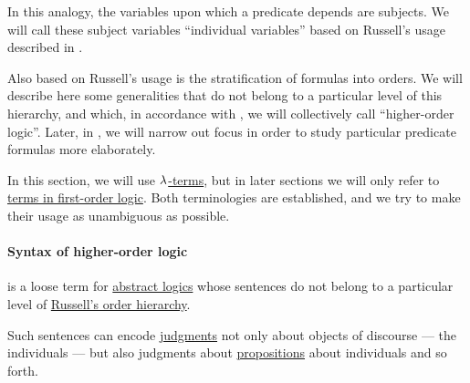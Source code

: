 \begin{remark}
  In this analogy, the variables upon which a predicate depends are subjects. We will call these subject variables \enquote{individual variables} based on Russell's usage described in .

  Also based on Russell's usage is the stratification of formulas into orders. We will describe here some generalities that do not belong to a particular level of this hierarchy, and which, in accordance with , we will collectively call \enquote{higher-order logic}. Later, in , we will narrow out focus in order to study particular predicate formulas more elaborately.
\end{remark}

\begin{remark}\label{rem:simply_typed_hol_term_ambiguity}
  In this section, we will use \hyperref[def:typed_lambda_term]{\( {\mathrm \lambda} \)-terms}, but in later sections we will only refer to \hyperref[def:first_order_syntax/term]{terms in first-order logic}. Both terminologies are established, and we try to make their usage as unambiguous as possible.
\end{remark}

\paragraph{Syntax of higher-order logic}

\begin{concept}\label{con:higher_order_logic}
   is a loose term for \hyperref[def:abstract_logic]{abstract logics} whose sentences do not belong to a particular level of \hyperref[con:ramified_type_theory]{Russell's order hierarchy}.

  Such sentences can encode \hyperref[con:judgment]{judgments} not only about objects of discourse --- the individuals --- but also judgments about \hyperref[con:proposition]{propositions} about individuals and so forth.
\end{concept}

